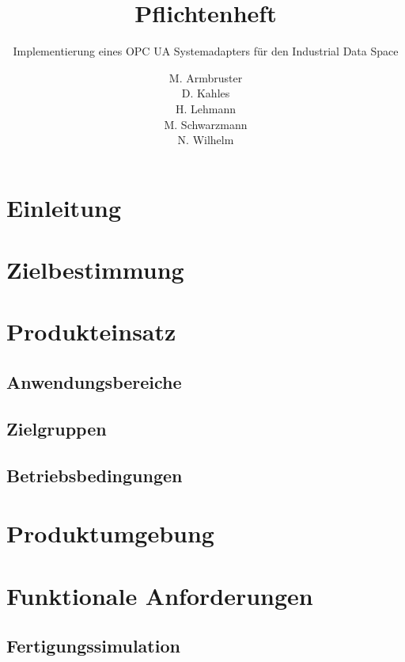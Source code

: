 \documentclass[parskip=full]{scrartcl}
\title{Pflichtenheft}
\subtitle{Implementierung eines OPC UA Systemadapters für den Industrial Data Space}
\author{
    M. Armbruster\\
    D. Kahles\\
    H. Lehmann\\
    M. Schwarzmann\\
    N. Wilhelm
}
\begin{document}
\maketitle
\tableofcontents
\pagebreak

\section{Einleitung}
\Blindtext[1]

\section{Zielbestimmung}
\Blindtext[1]

\section{Produkteinsatz}
\subsection{Anwendungsbereiche}
\Blindtext[1]

\subsection{Zielgruppen}
\Blindtext[1]

\subsection{Betriebsbedingungen}
\Blindtext[1]

\section{Produktumgebung}
\Blindtext[1]

\section{Funktionale Anforderungen}
\subsection{Fertigungssimulation}
\end{document}
